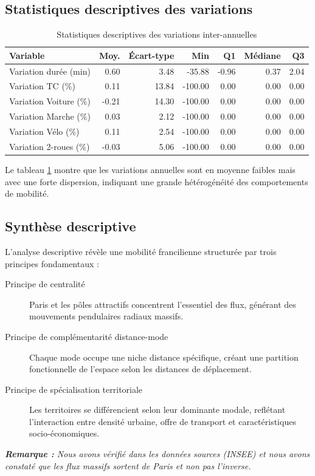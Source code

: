 \documentclass[11pt,a4paper]{article}
\begin{document}
\subsection{Statistiques descriptives des variations}
\begin{table}[H]
    \centering
    \caption{Statistiques descriptives des variations inter-annuelles}
    \label{tab:stats_variations}
    \begin{tabular}{lrrrrrr}
    \toprule
    \textbf{Variable} & \textbf{Moy.} & \textbf{Écart-type} & \textbf{Min} & \textbf{Q1} & \textbf{Médiane} & \textbf{Q3} \\
    \midrule
    Variation durée (min) & 0.60 & 3.48 & -35.88 & -0.96 & 0.37 & 2.04 \\
    Variation TC (\%) & 0.11 & 13.84 & -100.00 & 0.00 & 0.00 & 0.00 \\
    Variation Voiture (\%) & -0.21 & 14.30 & -100.00 & 0.00 & 0.00 & 0.00 \\
    Variation Marche (\%) & 0.03 & 2.12 & -100.00 & 0.00 & 0.00 & 0.00 \\
    Variation Vélo (\%) & 0.11 & 2.54 & -100.00 & 0.00 & 0.00 & 0.00 \\
    Variation 2-roues (\%) & -0.03 & 5.06 & -100.00 & 0.00 & 0.00 & 0.00 \\
    \bottomrule
    \end{tabular}
\end{table}
Le tableau \ref{tab:stats_variations} montre que les variations annuelles sont en moyenne faibles mais avec une forte dispersion, indiquant une grande hétérogénéité des comportements de mobilité.
\subsection{Synthèse descriptive}
L’analyse descriptive révèle une mobilité francilienne structurée par trois principes fondamentaux :
\begin{description}
\item[Principe de centralité] Paris et les pôles attractifs concentrent l’essentiel des flux, générant des mouvements pendulaires radiaux massifs.
\item[Principe de complémentarité distance-mode] Chaque mode occupe une niche distance spécifique, créant une partition fonctionnelle de l'espace selon les distances de déplacement.
\item[Principe de spécialisation territoriale] Les territoires se différencient selon leur dominante modale, reflétant l’interaction entre densité urbaine, offre de transport et caractéristiques socio-économiques.
\end{description}
\begin{center}
\textit{\textbf{Remarque :} Nous avons vérifié dans les données sources (INSEE) et nous avons constaté que les flux massifs sortent de Paris et non pas l'inverse.}
\end{center}
\end{document}
